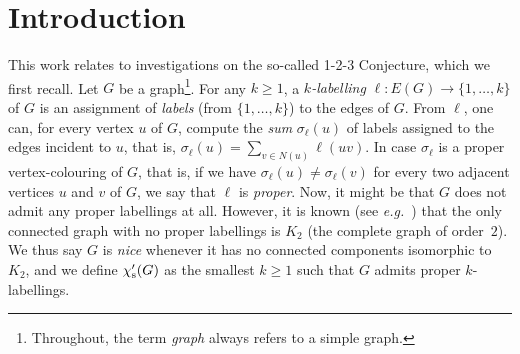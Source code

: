 \documentclass[a4paper,11pt,dvipsnames]{elsarticle}
\begin{document}
\newcommand{\qedclaim}{\hfill $\diamond$ \medskip}
\newenvironment{proofclaim}{\noindent{\em Proof of the claim.}}{\qedclaim}

\newcommand{\p}{\textsf{P}\xspace}
\newcommand{\np}{\textsf{NP}\xspace}
\newcommand{\chis}{\chi'_{\rm s}}
\newcommand{\mlw}{{\rm ML}^{\rm W}}
\newcommand{\mlp}{{\rm ML}^{\rm P}}
\newcommand{\mvw}{{\rm MV}^{\rm W}}
\newcommand{\mvp}{{\rm MV}^{\rm P}}
\newcommand{\mew}{{\rm ME}^{\rm W}}
\newcommand{\mep}{{\rm ME}^{\rm P}}


\section{Introduction}

This work relates to investigations on the so-called 1-2-3 Conjecture,
which we first recall.
Let $G$ be a graph\footnote{Throughout, the term \textit{graph} always refers to a simple graph.}.
For any $k \geq 1$, a \textit{$k$-labelling} $\ell: E(G) \rightarrow \{1,\dots,k\}$ of $G$ is an assignment of \textit{labels}
(from $\{1,\dots,k\}$) to the edges of $G$.
From $\ell$, one can, for every vertex $u$ of $G$, compute the \textit{sum} $\sigma_\ell(u)$ of labels assigned to the edges incident to $u$,
that is, $\sigma_\ell(u)=\sum_{v \in N(u)} \ell(uv)$.
In case $\sigma_\ell$ is a proper vertex-colouring of $G$, that is,
if we have $\sigma_\ell(u) \neq \sigma_\ell(v)$ for every two adjacent vertices $u$ and $v$ of $G$,
we say that $\ell$ is \textit{proper}.
Now, it might be that $G$ does not admit any proper labellings at all.
However, it is known (see \textit{e.g.}~\cite{KLT04}) that the only connected graph with no proper labellings is $K_2$ (the complete graph of order~$2$).
We thus say $G$ is \textit{nice} whenever it has no connected components isomorphic to $K_2$,
and we define $\chis(G)$ as the smallest $k \geq 1$ such that $G$ admits proper $k$-labellings.
\end{document}
